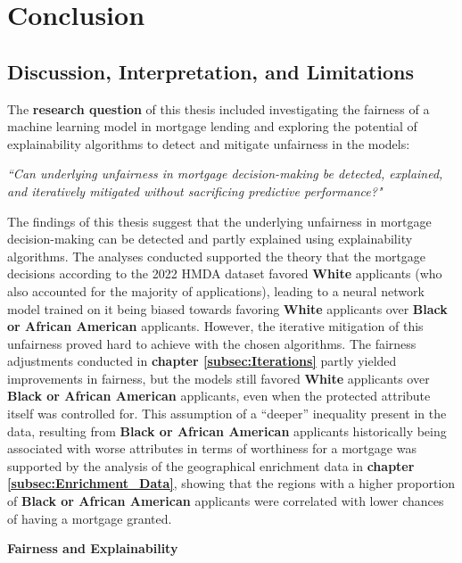 \chapter{Conclusion}\label{ch:discussion}

\section{Discussion, Interpretation, and Limitations}\label{sec:discussion}

The \textbf{research question} of this thesis included investigating the fairness of a machine learning model in mortgage lending and exploring the potential of explainability algorithms to detect and mitigate unfairness in the models:

\textit{“Can underlying unfairness in mortgage decision-making be detected, explained, and iteratively mitigated without sacrificing predictive performance?"}

The findings of this thesis suggest that the underlying unfairness in mortgage decision-making can be detected and partly explained using explainability algorithms. 
The analyses conducted supported the theory that the mortgage decisions according to the 2022 HMDA dataset favored \textbf{White} applicants (who also accounted for the majority of applications), leading to a neural network model trained on it being biased towards favoring \textbf{White} applicants over \textbf{Black or African American} applicants.
However, the iterative mitigation of this unfairness proved hard to achieve with the chosen algorithms. 
The fairness adjustments conducted in \textbf{chapter \ref{subsec:Iterations}} partly yielded improvements in fairness, but the models still favored \textbf{White} applicants over \textbf{Black or African American} applicants, even when the protected attribute itself was controlled for.
This assumption of a “deeper” inequality present in the data, resulting from \textbf{Black or African American} applicants historically being associated with worse attributes in terms of worthiness for a mortgage was supported by the analysis of the geographical enrichment data in \textbf{chapter \ref{subsec:Enrichment_Data}}, showing that the regions with a higher proportion of \textbf{Black or African American} applicants were correlated with lower chances of having a mortgage granted.


\textbf{Fairness and Explainability}

